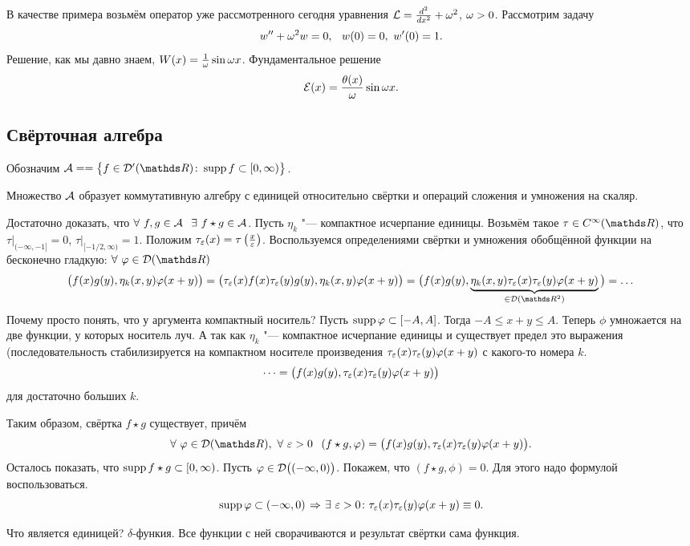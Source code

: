 В качестве примера возьмём оператор уже рассмотренного сегодня уравнения $\mathcal L = \frac{d^2}{dx^2} + \omega^2$, $\omega>0$. Рассмотрим задачу
\[
  w''+\w^2w = 0,\pau w(0)=0,\ w'(0)=1.
\]
Решение, как мы давно знаем, $W(x) = \frac1{\omega}\sin\omega x$. Фундаментальное решение
\[
 \mathcal E(x) = \frac{\theta(x)}{\omega}\sin\omega x.
\]

\subsection{Свёрточная алгебра}
Обозначим $\A = = \big\{f\in \D'(\R)\colon \supp f\subset [0,\infty)\big\}$.
\begin{Lem}
  Множество $\mathcal A$ образует коммутативную алгебру с единицей относительно свёртки и операций сложения и умножения на скаляр.
\end{Lem}
\begin{Proof}
Достаточно доказать, что $\forall\ f,g\in\A\pau \exists\ f\star g\in\A$.
Пусть $\eta_k$ "--- компактное исчерпание единицы. Возьмём такое $\tau\in C^{\infty}(\R)$, что $\tau \big|_{(-\infty,-1]}=0$, $\tau\big|_{[-1/2,\infty)}=1$. Положим $\tau_\varepsilon(x) = \tau\left(\frac x{\varepsilon}\right)$. Воспользуемся определениями свёртки и умножения обобщённой функции на бесконечно гладкую: $\forall\ \phi\in\D(\R)$
\[
  \big(f(x)g(y),\eta_k(x,y)\phi(x+y)\big) = \big(\tau_\e(x)f(x)\tau_\e(y)g(y),\eta_k(x,y)\phi(x+y)\big)=
  \big(f(x)g(y),\underbrace{\eta_k(x,y)\tau_\e(x)\tau_\e(y)\phi(x+y)}_{\in\D(\R^2)}\big)=\dots
\]
Почему просто понять, что у аргумента компактный носитель? Пусть $\operatorname{supp}\varphi\subset[-A,A]$. Тогда $-A\le x+y\le A$. Теперь $\phi$ умножается на две функции, у которых носитель луч. А так как $\eta_k$ "--- компактное исчерпание единицы и существует предел это выражения (последовательность стабилизируется на компактном носителе произведения $\tau_\varepsilon(x)\tau_\varepsilon(y)\varphi(x+y)$ с какого-то номера $k$.
\[
\dots = \big(f(x)g(y),\tau_\varepsilon(x)\tau_\varepsilon(y)\varphi(x+y)\big)
\]
для достаточно больших $k$.

Таким образом, свёртка $f\star g$ существует, причём
\[
  \forall\ \phi\in\D(\R),\ \forall\ \e>0\pau (f\star g,\phi) = \big(f(x)g(y),\tau_\e(x)\tau_\e(y)\phi(x+y)\big).
\]
Осталось показать, что $\operatorname{supp} f\star g\subset [0,\infty)$. Пусть $\varphi\in\mathcal D\big((-\infty,0)\big)$. Покажем, что $(f\star g,\phi)=0$. Для этого надо формулой воспользоваться.
\[
  \supp\phi\subset(-\infty,0)\imp\exists\ \e>0\colon \tau_\e(x)\tau_\e(y)\phi(x+y)\equiv0.
\]

Что является единицей? $\delta$-функия. Все функции с ней сворачиваются и результат свёртки сама функция.
\end{Proof}
